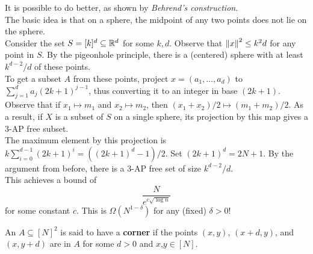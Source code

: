 			It is possible to do better, as shown by \emph{Behrend's construction}.\\
			The basic idea is that on a sphere, the midpoint of any two points does not lie on the sphere.\\
			Consider the set $S = [k]^d\subseteq\mathbb{R}^d$ for some $k,d$. Observe that $\left\lVert x\right\rVert^2 \le k^2 d$ for any point in $S$. By the pigeonhole principle, there is a (centered) sphere with at least $k^{d-2}/d$ of these points.\\
			To get a subset $A$ from these points, project $x = (a_1,\ldots,a_d)$ to $\sum_{j=1}^d a_j (2k+1)^{j-1}$, thus converting it to an integer in base $(2k+1)$. Observe that if $x_1 \mapsto m_1$ and $x_2 \mapsto m_2$, then $(x_1 + x_2)/2 \mapsto (m_1 + m_2)/2$. As a result, if $X$ is a subset of $S$ on a single sphere, its projection by this map gives a $3$-AP free subset.\\
			The maximum element by this projection is $k\sum_{i=0}^{d-1} (2k+1)^{i} = ((2k+1)^d - 1)/2$. Set $(2k+1)^d = 2N+1$. By the argument from before, there is a $3$-AP free set of size $k^{d-2}/d$.\\
			This achieves a bound of
			\[ \frac{N}{e^{c\sqrt{\log n}}} \]
			for some constant $c$. This is $\Omega(N^{1-\delta})$ for any (fixed) $\delta>0$!\\

			\begin{definition}[Corner]
				An $A\subseteq[N]^2$ is said to have a \textbf{corner} if the points $(x,y)$, $(x+d,y)$, and $(x,y+d)$ are in $A$ for some $d>0$ and $x$,$y\in[N]$.
			\end{definition}

